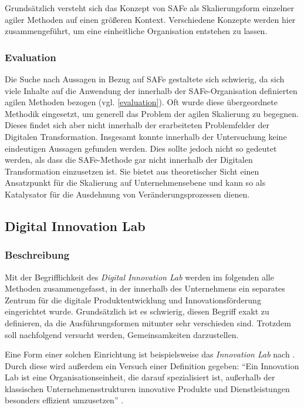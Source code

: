 Grundsätzlich versteht sich das Konzept von SAFe als Skalierungsform einzelner agiler Methoden auf einen größeren Kontext. Verschiedene Konzepte werden hier zusammengeführt, um eine einheitliche Organisation entstehen zu lassen.

\subsubsection{Evaluation}

Die Suche nach Aussagen in Bezug auf SAFe gestaltete sich schwierig, da sich viele Inhalte auf die Anwendung der innerhalb der SAFe-Organisation definierten agilen Methoden bezogen (vgl. \ref{evaluation}). Oft wurde diese übergeordnete Methodik eingesetzt, um generell das Problem der agilen Skalierung zu begegnen. Dieses findet sich aber nicht innerhalb der erarbeiteten Problemfelder der Digitalen Transformation. Insgesamt konnte innerhalb der Untersuchung keine eindeutigen Aussagen gefunden werden. Dies sollte jedoch nicht so gedeutet werden, als dass die SAFe-Methode gar nicht innerhalb der Digitalen Transformation  einzusetzen ist. Sie bietet aus theoretischer Sicht einen Ansatzpunkt für die Skalierung auf Unternehmensebene und kann so als Katalysator für die Ausdehnung von Veränderungsprozessen dienen.

\subsection{Digital Innovation Lab}

\subsubsection{Beschreibung}

Mit der Begrifflichkeit des \textit{Digital Innovation Lab} werden im folgenden alle Methoden zusammengefasst, in der innerhalb des Unternehmens ein separates Zentrum für die digitale Produktentwicklung und Innovationsförderung eingerichtet wurde. Grundsätzlich ist es schwierig, diesen Begriff exakt zu definieren, da die Ausführungsformen mitunter sehr verschieden sind. Trotzdem soll nachfolgend versucht werden, Gemeinsamkeiten darzustellen.

Eine Form einer solchen Einrichtung ist beispielsweise das \textit{Innovation Lab} nach . Durch diese wird außerdem ein Versuch einer Definition gegeben: ``Ein Innovation Lab ist eine Organisationseinheit, die darauf spezialisiert ist, außerhalb der klassischen Unternehmensstrukturen innovative Produkte und Dienstleistungen besonders effizient umzusetzen'' \cite{meyer_innovation_nodate}.

